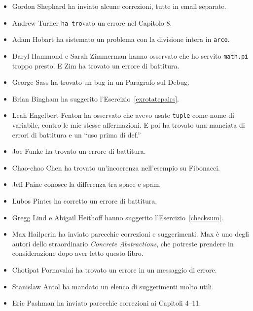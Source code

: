 \documentclass[10pt]{book}
\begin{document}
\begin{itemize}
\item Gordon Shephard ha inviato alcune correzioni, tutte in email separate.

\item Andrew Turner {\tt ha tro}vato un errore nel Capitolo 8.

\item Adam Hobart ha sistemato un problema con la divisione intera in
{\tt arco}.

\item Daryl Hammond e Sarah Zimmerman hanno osservato che ho servito {\tt math.pi} troppo presto. E Zim ha trovato un errore di battitura.

\item George Sass ha trovato un bug in un Paragrafo sul Debug.

\item Brian Bingham ha suggerito l'Esercizio~\ref{exrotatepairs}.

\item Leah Engelbert-Fenton ha osservato che avevo usate {\tt tuple}
come nome di variabile, contro le mie stesse affermazioni. E poi ha trovato una manciata di errori di battitura e un ``uso prima di def.''

\item Joe Funke ha trovato un errore di battitura.

\item Chao-chao Chen ha trovato un'incoerenza nell'esempio su Fibonacci.

\item Jeff Paine conosce la differenza tra space e spam.

\item Lubos Pintes ha corretto un errore di battitura.

\item Gregg Lind e Abigail Heithoff hanno suggerito l'Esercizio~\ref{checksum}.

\item Max Hailperin ha inviato parecchie correzioni e suggerimenti.  Max è uno degli autori dello straordinario {\em Concrete Abstractions}, che potreste prendere in considerazione dopo aver letto questo libro.

\item Chotipat Pornavalai ha trovato un errore in un messaggio di errore.

\item Stanislaw Antol ha mandato un elenco di suggerimenti molto utili.

\item Eric Pashman ha inviato parecchie correzioni ai Capitoli 4--11.


\end{itemize}
\end{document}
